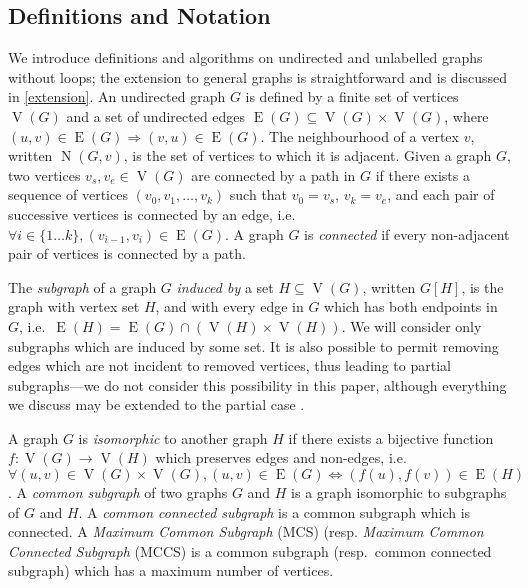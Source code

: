 \documentclass{llncs}
\begin{document}
\subsection{Definitions and Notation}

We introduce definitions and algorithms on undirected and unlabelled graphs without loops; the
extension to general graphs is straightforward and is discussed in \cref{extension}. An undirected
graph $G$ is defined by a finite set of vertices $\operatorname{V}(G)$ and a set of undirected edges
$\operatorname{E}(G) \subseteq \operatorname{V}(G) \times \operatorname{V}(G)$, where $(u, v) \in
\operatorname{E}(G) \Rightarrow (v, u) \in \operatorname{E}(G)$. The neighbourhood of
a vertex $v$, written $\operatorname{N}(G, v)$, is the set of vertices to which it is adjacent.
Given a graph $G$, two vertices $v_s, v_e \in \operatorname{V}(G)$ are connected by a path in $G$ if
there exists a sequence of vertices $(v_0, v_1, \ldots, v_k)$ such that $v_0 = v_s$, $v_k = v_e$,
and each pair of successive vertices is connected by an edge, i.e.\ $\forall i\in \{1 \ldots k \},
(v_{i-1}, v_i) \in \operatorname{E}(G)$. A graph $G$ is \emph{connected} if every non-adjacent pair
of vertices is connected by a path.

The \emph{subgraph} of a graph $G$ \emph{induced by} a set $H \subseteq \operatorname{V}(G)$,
written $G[H]$, is the graph with vertex set $H$, and with every edge in $G$ which has both
endpoints in $G$, i.e.\ $\operatorname{E}(H) = \operatorname{E}(G) \cap (\operatorname{V}(H) \times
\operatorname{V}(H))$. We will consider only subgraphs which are induced by some set. It is also
possible to permit removing edges which are not incident to removed vertices, thus leading to
partial subgraphs---we do not consider this possibility in this paper, although everything we
discuss may be extended to the partial case \cite{DBLP:conf/cp/NdiayeS11}.

A graph $G$ is \emph{isomorphic} to another graph $H$ if there exists a bijective function $f :
\operatorname{V}(G) \rightarrow \operatorname{V}(H)$ which preserves edges and non-edges, i.e.\
$\forall (u, v) \in \operatorname{V}(G) \times \operatorname{V}(G), (u, v) \in \operatorname{E}(G)
\Leftrightarrow (f(u),f(v)) \in \operatorname{E}(H)$.  A \emph{common subgraph} of two graphs $G$
and $H$ is a graph isomorphic to subgraphs of $G$ and $H$. A \emph{common connected subgraph} is a
common subgraph which is connected.  A \emph{Maximum Common Subgraph} (MCS) (resp. \emph{Maximum
Common Connected Subgraph} (MCCS) is a common subgraph (resp.\ common connected subgraph) which has
a maximum number of vertices.
\end{document}
